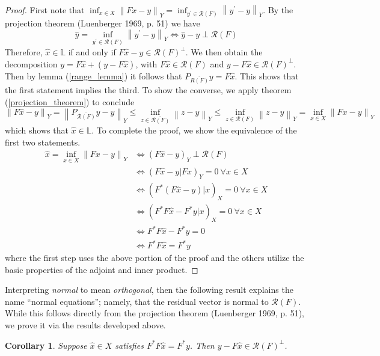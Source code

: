\documentclass[12pt]{article}
\newcommand*{\norm}[1]{\left\lVert#1\right\rVert}
\newcommand{\R}{\mathcal{R}}
\newtheorem{corollary}{Corollary}
\begin{document}
\begin{proof} 
First note that $\inf_{x \in X} \norm{Fx - y}_Y = \inf_{y^\prime \in \R(F)} \norm{y^\prime - y}_Y$. By the projection theorem (Luenberger 1969, p. 51) 
we have \[\hat{y} = \inf_{y^\prime \in \R(F)} \norm{y^\prime - y}_Y \iff \hat{y} - y \perp \R(F)\] 
Therefore, $\hat{x} \in \mathbb{L}$ if and only if $F\hat{x} - y \in \R(F)^\perp$. We then obtain the decomposition
$y = F\hat{x} + (y - F\hat{x})$, with $F\hat{x} \in \R(F)$ and $y - F\hat{x} \in \R(F)^\perp$. Then by lemma (\ref{range_lemma}) it follows that
$P_{\overline{R(F)}} y = F\hat{x}$. This shows that the first statement implies the third. To show the converse, we apply theorem (\ref{projection_theorem})
to conclude \[\norm{F\hat{x} - y}_Y = \norm{P_{\overline{\R(F)}}y - y}_Y \leq \inf_{z \in \overline{\R(F)}} \norm{z - y}_Y \leq \inf_{z \in \R(F)} \norm{z - y}_Y = \inf_{x \in X} \norm{Fx - y}_Y\]
which shows that $\hat{x} \in \mathbb{L}$. To complete the proof, we show the equivalence of the first two statements. 
\begin{align*} 
\hat{x} = \inf_{x \in X} \norm{Fx - y}_Y &\iff (F\hat{x} - y)_Y \perp \R(F) \\
                                                            &\iff (F\hat{x} - y| Fx)_Y = 0 \ \forall x \in X \\
                                                            &\iff (F^*(F\hat{x} - y)| x)_X = 0 \ \forall x \in X \\
                                                            &\iff (F^*F\hat{x} - F^*y| x)_X = 0 \ \forall x \in X \\
                                                            &\iff F^*F\hat{x} - F^*y = 0 \\
                                                            &\iff F^*F\hat{x} = F^*y                                                            
\end{align*} 
where the first step uses the above portion of the proof and the others utilize the basic properties of the adjoint and inner product.
\end{proof} 

Interpreting \textit{normal} to mean \textit{orthogonal}, then the following result explains the name ``normal equations''; namely, that 
the residual vector is normal to $\R(F)$. While this follows directly from the projection theorem (Luenberger 1969, p. 51), we prove it
via the results developed above. 

\begin{corollary} \label{normal_residual}
Suppose $\hat{x} \in X$ satisfies $F^* F\hat{x} = F^* y$. Then $y - F\hat{x} \in \R(F)^\perp$.
\end{corollary}
\end{document}
